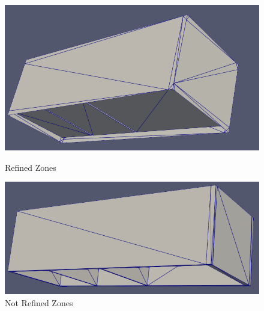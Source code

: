 \documentclass[10pt]{beamer}
\begin{document}
\begin{frame}
    \begin{figure}
      \centering
      \begin{minipage}[b]{0.48\textwidth}
        \centering
        \includegraphics[width=\textwidth]{../image/3zonerefine.png}
        \caption{Refined Zones}
      \end{minipage}\hfill
      \begin{minipage}[b]{0.48\textwidth}
        \centering
        \includegraphics[width=\textwidth]{../image/3zones_not_refined.png}
        \caption{Not Refined Zones}
      \end{minipage}
    \end{figure}
\end{frame}
\end{document}
